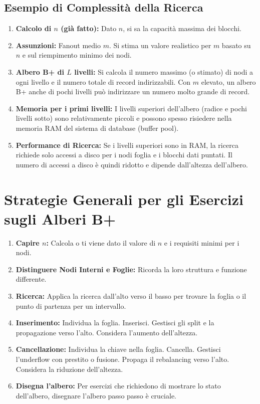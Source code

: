 \subsection{Esempio di Complessità della Ricerca}
\begin{enumerate}
    \item \textbf{Calcolo di $n$ (già fatto):} Dato $n$, si sa la capacità massima dei blocchi.
    \item \textbf{Assunzioni:} Fanout medio $m$. Si stima un valore realistico per $m$ basato su $n$ e sul riempimento minimo dei nodi.
    \item \textbf{Albero B+ di $L$ livelli:} Si calcola il numero massimo (o stimato) di nodi a ogni livello e il numero totale di record indirizzabili. Con $m$ elevato, un albero B+ anche di pochi livelli può indirizzare un numero molto grande di record.
    \item \textbf{Memoria per i primi livelli:} I livelli superiori dell'albero (radice e pochi livelli sotto) sono relativamente piccoli e possono spesso risiedere nella memoria RAM del sistema di database (buffer pool).
    \item \textbf{Performance di Ricerca:} Se i livelli superiori sono in RAM, la ricerca richiede solo accessi a disco per i nodi foglia e i blocchi dati puntati. Il numero di accessi a disco è quindi ridotto e dipende dall'altezza dell'albero.
\end{enumerate}\section{Strategie Generali per gli Esercizi sugli Alberi B+}
\begin{enumerate}
    \item \textbf{Capire $n$:} Calcola o ti viene dato il valore di $n$ e i requisiti minimi per i nodi.
    \item \textbf{Distinguere Nodi Interni e Foglie:} Ricorda la loro struttura e funzione differente.
    \item \textbf{Ricerca:} Applica la ricerca dall'alto verso il basso per trovare la foglia o il punto di partenza per un intervallo.
    \item \textbf{Inserimento:} Individua la foglia. Inserisci. Gestisci gli split e la propagazione verso l'alto. Considera l'aumento dell'altezza.
    \item \textbf{Cancellazione:} Individua la chiave nella foglia. Cancella. Gestisci l'underflow con prestito o fusione. Propaga il rebalancing verso l'alto. Considera la riduzione dell'altezza.
    \item \textbf{Disegna l'albero:} Per esercizi che richiedono di mostrare lo stato dell'albero, disegnare l'albero passo passo è cruciale.
\end{enumerate}

